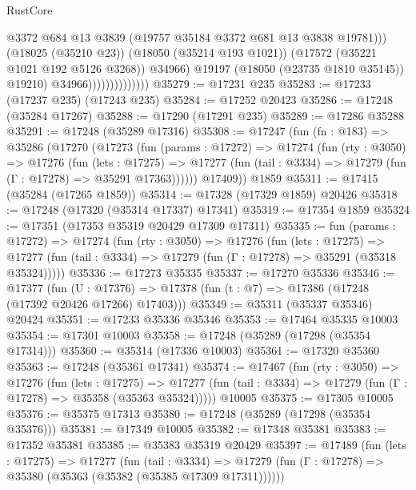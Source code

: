 \begin{lexlean}{RustCore}
\begin{coremodule}
                                        @3372
                                        @684
                                        @13
                                        @3839
                                        (@19757 @35184 @3372 @681 @13 @3838 @19781)))
                                    (@18025 (@35210 @23))
                                    (@18050 (@35214 @193 @1021))
                                    (@17572 (@35221 @1021 @192 @5126 @3268))
                                    @34966)
                                  @19197
                                  (@18050 (@23735 @1810 @35145))
                                  @19210)
                                @34966))))))))))))))
@35279 := @17231 @235
@35283 := @17233 (@17237 @235) (@17243 @235)
@35284 := @17252 @20423
@35286 := @17248 (@35284 @17267)
@35288 := @17290 (@17291 @235)
@35289 := @17286 @35288
@35291 := @17248 (@35289 @17316)
@35308 := @17247
    (fun (fn : @183) =>
    @35286
      (@17270
        (@17273
          (fun (params : @17272) =>
          @17274
            (fun (rty : @3050) =>
            @17276
              (fun (lets : @17275) =>
              @17277 (fun (tail : @3334) => @17279 (fun (Γ : @17278) => @35291 @17363))))))
        @17409))
    @1859
@35311 := @17415 (@35284 (@17265 @1859))
@35314 := @17328 (@17329 @1859) @20426
@35318 := @17248 (@17320 (@35314 @17337) @17341)
@35319 := @17354 @1859
@35324 := @17351 (@17353 @35319 @20429 @17309 @17311)
@35335 := fun (params : @17272) =>
  @17274
    (fun (rty : @3050) =>
    @17276
      (fun (lets : @17275) =>
      @17277 (fun (tail : @3334) => @17279 (fun (Γ : @17278) => @35291 (@35318 @35324)))))
@35336 := @17273 @35335
@35337 := @17270 @35336
@35346 := @17377
    (fun (U : @17376) => @17378 (fun (t : @7) => @17386 (@17248 (@17392 @20426 @17266) @17403)))
@35349 := @35311 (@35337 @35346) @20424
@35351 := @17233 @35336 @35346
@35353 := @17464 @35335 @10003
@35354 := @17301 @10003
@35358 := @17248 (@35289 (@17298 (@35354 @17314)))
@35360 := @35314 (@17336 @10003)
@35361 := @17320 @35360
@35363 := @17248 (@35361 @17341)
@35374 := @17467
    (fun (rty : @3050) =>
    @17276
      (fun (lets : @17275) =>
      @17277 (fun (tail : @3334) => @17279 (fun (Γ : @17278) => @35358 (@35363 @35324)))))
    @10005
@35375 := @17305 @10005
@35376 := @35375 @17313
@35380 := @17248 (@35289 (@17298 (@35354 @35376)))
@35381 := @17349 @10005
@35382 := @17348 @35381
@35383 := @17352 @35381
@35385 := @35383 @35319 @20429
@35397 := @17489
    (fun (lets : @17275) =>
    @17277
      (fun (tail : @3334) =>
      @17279 (fun (Γ : @17278) => @35380 (@35363 (@35382 (@35385 @17309 @17311))))))

\end{coremodule}
\end{lexlean}
